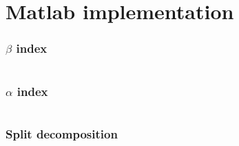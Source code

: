 \documentclass[./main.tex]{subfiles}
\begin{document}
\ifSubfilesClassLoaded{\mainmatter\appendix}{}

\chapter{Matlab implementation} \label{appx:a1}

\subsection*{$\beta$ index}
\inputminted{matlab}{code/beta.m}
\clearpage

\subsection*{$\alpha$ index}
\inputminted{matlab}{code/alfa.m}
\clearpage

\subsection*{Split decomposition}
\inputminted{matlab}{code/split_decomp.m}
\clearpage

\inputminted{matlab}{code/split_metric.m}
\vspace{2\baselineskip}
\inputminted{matlab}{code/alfa_sx.m}
\clearpage
\inputminted{matlab}{code/alfa_dx.m}
\end{document}
